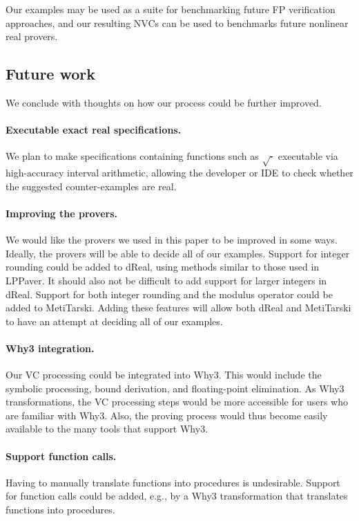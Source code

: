 \documentclass[runningheads]{llncs}
\begin{document}
Our examples may be used as a suite for benchmarking future FP verification approaches, and our resulting NVCs can be used to benchmarks future nonlinear real provers.

\subsection*{Future work}

We conclude with thoughts on how our process could be further improved.

\paragraph*{Executable exact real specifications.}
We plan to make specifications containing functions such as $\sqrt{\cdot}$ executable via high-accuracy interval arithmetic, allowing the developer or IDE to check whether the {suggested} counter-examples are real.

\paragraph*{Improving the provers.}
We would like the provers we used in this paper to be improved in some ways.
Ideally, the provers will be able to decide all of our examples.
Support for integer rounding could be added to dReal, using methods similar to those used in LPPaver.
It should also not be difficult to add support for larger integers in dReal.
Support for  both integer rounding and the modulus operator could be added to MetiTarski.
Adding these features will allow both dReal and MetiTarski to have an attempt at deciding all of our examples.

\paragraph*{Why3 integration.}
Our VC processing could be integrated into Why3.
This would include the symbolic processing, bound derivation, and floating-point elimination.
As Why3 transformations, the VC processing steps would be more accessible for users who are familiar with Why3.
Also, the proving process would thus become easily available to the many tools that support Why3.

\paragraph*{Support function calls.}
Having to manually translate functions into procedures is undesirable.
Support for function calls could be added, e.g.,
by a Why3 transformation that translates functions into procedures.
\end{document}
